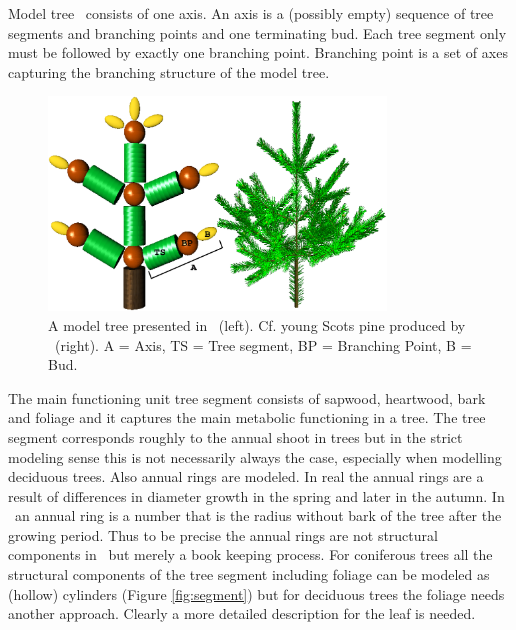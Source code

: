 \begin{definition}[\lignum]
Model  tree \lignum\ consists  of one  axis.  An  axis is  a (possibly
empty)  sequence  of  tree  segments  and  branching  points  and  one
terminating bud.  Each  tree segment only must be  followed by exactly
one branching point.   Branching point is a set  of axes capturing the
branching structure of the model tree.
\end{definition} 

\begin{figure}[h]
\begin{center}
\includegraphics[width=0.8\textwidth,height=0.5\textwidth]{lignum3d.eps}
\caption{\label{fig:struct} A model tree presented in \lignum\
(left). Cf. young Scots pine produced by \lignum\ (right). A = Axis, 
TS = Tree segment, BP = Branching Point, B = Bud.}
\end{center}
\end{figure}

The main functioning unit tree segment consists of sapwood, heartwood,
bark and foliage  and it captures the main  metabolic functioning in a
tree.  The  tree segment  corresponds roughly to  the annual  shoot in
trees but in the strict  modeling sense this is not necessarily always
the case, especially when modelling deciduous trees. Also annual rings
are modeled.  In real the annual  rings are a result of differences in
diameter growth in the spring and later in the autumn.  In \lignum\ an
annual ring  is a number that is  the radius without bark  of the tree
after the growing period.  Thus to be precise the annual rings are not
structural components  in \lignum\ but merely a  book keeping process.
For coniferous trees all the structural components of the tree segment
including  foliage  can  be  modeled  as  (hollow)  cylinders  (Figure
\ref{fig:segment}) but  for deciduous trees the  foliage needs another
approach.  Clearly a more detailed description for the leaf is needed.

